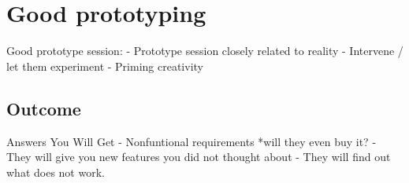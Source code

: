 \documentclass{article}
\begin{document}
\section{Good prototyping}

Good prototype session:
- Prototype session closely related to reality
- Intervene / let them experiment
- Priming creativity 

 
\subsection{Outcome}

Answers You Will Get
- Nonfuntional requirements *will they even buy it?
- They will give you new features you did not thought about
- They will find out what does not work.



\end{document}
